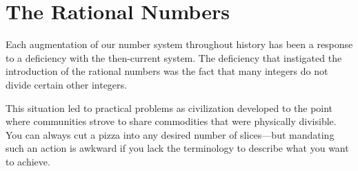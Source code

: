 \section{The Rational Numbers}
\label{sec:rationals}


Each augmentation of our number system throughout history has been a
response to a deficiency with the then-current system.  The deficiency
that instigated the introduction of the rational numbers was the fact
that many integers do not divide certain other integers.

This situation led to practical problems as civilization developed to
the point where communities strove to share commodities that were
physically divisible.  You can always cut a pizza into any desired
number of slices---but mandating such an action is awkward if you lack
the terminology to describe what you want to achieve.

